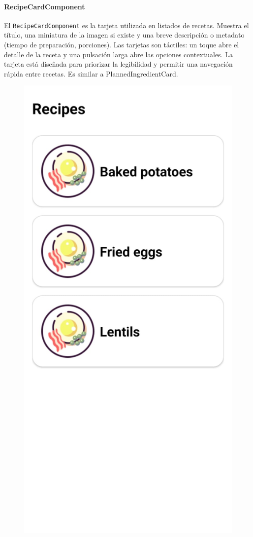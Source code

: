 \documentclass[twoside, openright, 11pt]{report}
\begin{document}
				\paragraph{RecipeCardComponent}
					El \texttt{RecipeCardComponent} es la tarjeta utilizada en listados de recetas. Muestra el título, una miniatura de la imagen si existe y una breve descripción o metadato (tiempo de preparación, porciones). Las tarjetas son táctiles: un toque abre el detalle de la receta y una pulsación larga abre las opciones contextuales. La tarjeta está diseñada para priorizar la legibilidad y permitir una navegación rápida entre recetas. Es similar a PlannedIngredientCard.
						
					\begin{figure}[H]
						\centering
						\includegraphics[scale=0.1]{imagenes/RecipesScreen.jpeg}

\end{figure}
\end{document}
